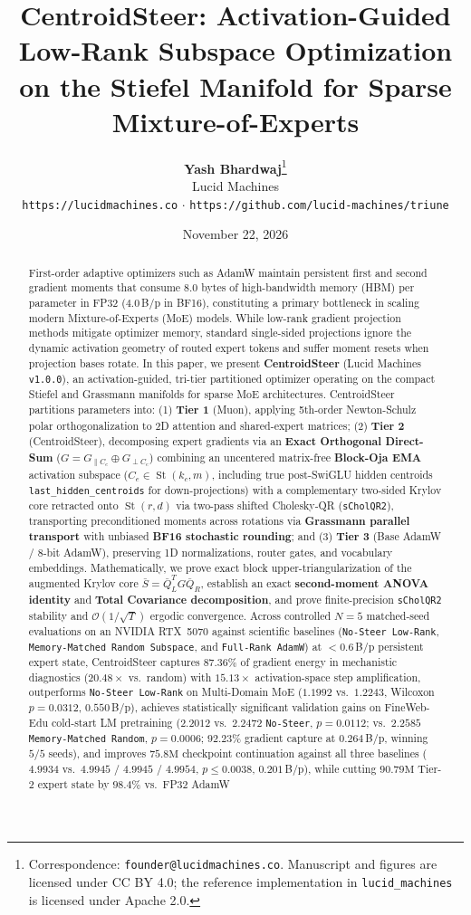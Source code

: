 \documentclass[10pt,twocolumn,letterpaper]{article}
\title{\textbf{CentroidSteer: Activation-Guided Low-Rank Subspace Optimization on the Stiefel Manifold for Sparse Mixture-of-Experts}}
\author{
    \textbf{Yash Bhardwaj}\thanks{Correspondence: \texttt{founder@lucidmachines.co}. Manuscript and figures are licensed under CC BY 4.0; the reference implementation in \texttt{lucid\_machines} is licensed under Apache 2.0.} \\
    Lucid Machines \\
    \texttt{https://lucidmachines.co} \;$\cdot$\; \texttt{https://github.com/lucid-machines/triune}
}
\date{November 22, 2026}
\begin{document}
\maketitle

\begin{abstract}
First-order adaptive optimizers such as AdamW maintain persistent first and second gradient moments that consume $8.0$ bytes of high-bandwidth memory (HBM) per parameter in FP32 ($4.0$\,B/p in BF16), constituting a primary bottleneck in scaling modern Mixture-of-Experts (MoE) models. While low-rank gradient projection methods mitigate optimizer memory, standard single-sided projections ignore the dynamic activation geometry of routed expert tokens and suffer moment resets when projection bases rotate. In this paper, we present \textbf{CentroidSteer} (Lucid Machines \texttt{v1.0.0}), an activation-guided, tri-tier partitioned optimizer operating on the compact Stiefel and Grassmann manifolds for sparse MoE architectures. CentroidSteer partitions parameters into: (1) \textbf{Tier 1} (Muon), applying 5th-order Newton-Schulz polar orthogonalization to 2D attention and shared-expert matrices; (2) \textbf{Tier 2} (CentroidSteer), decomposing expert gradients via an \textbf{Exact Orthogonal Direct-Sum} ($G = G_{\parallel C_e} \oplus G_{\perp C_e}$) combining an uncentered matrix-free \textbf{Block-Oja EMA} activation subspace ($C_e \in \operatorname{St}(k_c, m)$, including true post-SwiGLU hidden centroids \texttt{last\_hidden\_centroids} for down-projections) with a complementary two-sided Krylov core retracted onto $\operatorname{St}(r, d)$ via two-pass shifted Cholesky-QR (\texttt{sCholQR2}), transporting preconditioned moments across rotations via \textbf{Grassmann parallel transport} with unbiased \textbf{BF16 stochastic rounding}; and (3) \textbf{Tier 3} (Base AdamW / 8-bit AdamW), preserving 1D normalizations, router gates, and vocabulary embeddings. Mathematically, we prove exact block upper-triangularization of the augmented Krylov core $\bar{S} = \bar{Q}_L^T G \bar{Q}_R$, establish an exact \textbf{second-moment ANOVA identity} and \textbf{Total Covariance decomposition}, and prove finite-precision \texttt{sCholQR2} stability and $\mathcal{O}(1/\sqrt{T})$ ergodic convergence. Across controlled $N=5$ matched-seed evaluations on an NVIDIA RTX~5070 against scientific baselines (\texttt{No-Steer Low-Rank}, \texttt{Memory-Matched Random Subspace}, and \texttt{Full-Rank AdamW}) at $<0.6$\,B/p persistent expert state, CentroidSteer captures $87.36\%$ of gradient energy in mechanistic diagnostics ($20.48\times$ vs.\ random) with $15.13\times$ activation-space step amplification, outperforms \texttt{No-Steer Low-Rank} on Multi-Domain MoE ($1.1992$ vs.\ $1.2243$, Wilcoxon $p=0.0312$, $0.550$\,B/p), achieves statistically significant validation gains on FineWeb-Edu cold-start LM pretraining ($2.2012$ vs.\ $2.2472$ \texttt{No-Steer}, $p=0.0112$; vs.\ $2.2585$ \texttt{Memory-Matched Random}, $p=0.0006$; $92.23\%$ gradient capture at $0.264$\,B/p, winning $5/5$ seeds), and improves $75.8\text{M}$ checkpoint continuation against all three baselines ($4.9934$ vs.\ $4.9945$ / $4.9945$ / $4.9954$, $p \le 0.0038$, $0.201$\,B/p), while cutting $90.79\text{M}$ Tier-2 expert state by $98.4\%$ vs.\ FP32 AdamW 
\end{abstract}
\end{document}
